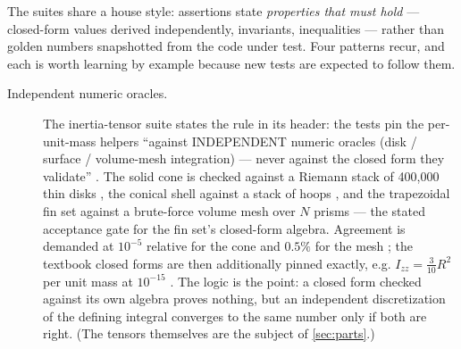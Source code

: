 The suites share a house style: assertions state \emph{properties that must hold} ---
closed-form values derived independently, invariants, inequalities --- rather than golden
numbers snapshotted from the code under test. Four patterns recur, and each is worth
learning by example because new tests are expected to follow them.

\begin{description}

\item[Independent numeric oracles.] The inertia-tensor suite states the rule in its
header: the tests pin the per-unit-mass helpers ``against INDEPENDENT numeric oracles
(disk / surface / volume-mesh integration) --- never against the closed form they
validate'' . The solid cone is checked
against a Riemann stack of 400{,}000 thin disks
, the conical shell against a stack of hoops
, and the trapezoidal fin set against a
brute-force volume mesh over $N$ prisms
 --- the stated acceptance gate for the fin
set's closed-form algebra. Agreement is demanded at $10^{-5}$ relative for the cone
 and $0.5\%$ for the mesh
; the textbook closed forms are then
additionally pinned exactly, e.g. $I_{zz} = \tfrac{3}{10}R^2$ per unit mass at
$10^{-15}$ . The logic is the point: a
closed form checked against its own algebra proves nothing, but an independent
discretization of the defining integral converges to the same number only if both are
right. (The tensors themselves are the subject of \cref{sec:parts}.)


\end{description}
